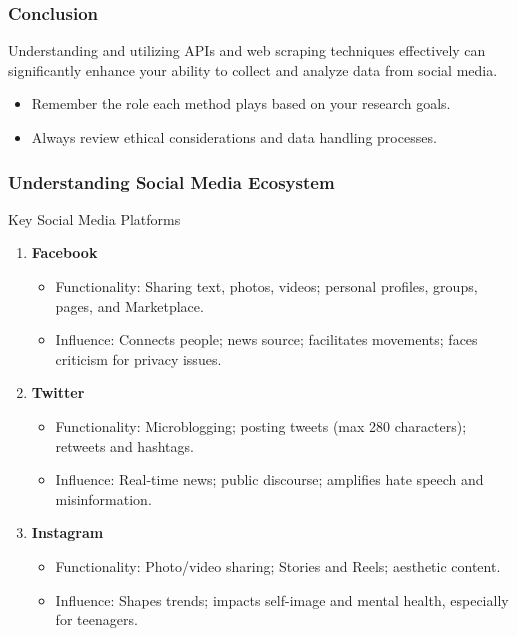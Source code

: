\documentclass{beamer}
\begin{document}
\begin{frame}[fragile]
    \frametitle{Conclusion}
    Understanding and utilizing APIs and web scraping techniques effectively can significantly enhance your ability to collect and analyze data from social media. 
    \begin{itemize}
        \item Remember the role each method plays based on your research goals.
        \item Always review ethical considerations and data handling processes.
    \end{itemize}
\end{frame}

\begin{frame}[fragile]
    \frametitle{Understanding Social Media Ecosystem}
    \begin{block}{Key Social Media Platforms}
        \begin{enumerate}
            \item \textbf{Facebook}
                \begin{itemize}
                    \item Functionality: Sharing text, photos, videos; personal profiles, groups, pages, and Marketplace.
                    \item Influence: Connects people; news source; facilitates movements; faces criticism for privacy issues.
                \end{itemize}
            \item \textbf{Twitter}
                \begin{itemize}
                    \item Functionality: Microblogging; posting tweets (max 280 characters); retweets and hashtags.
                    \item Influence: Real-time news; public discourse; amplifies hate speech and misinformation.
                \end{itemize}
            \item \textbf{Instagram}
                \begin{itemize}
                    \item Functionality: Photo/video sharing; Stories and Reels; aesthetic content.
                    \item Influence: Shapes trends; impacts self-image and mental health, especially for teenagers.
                \end{itemize}
        \end{enumerate}
    \end{block}
\end{frame}
\end{document}
